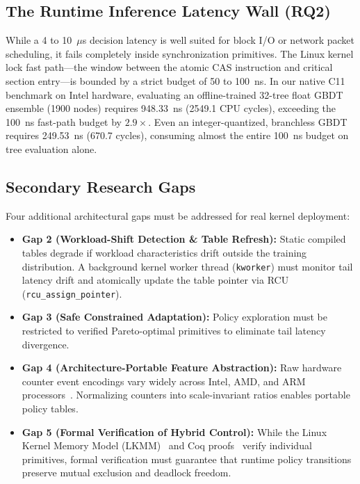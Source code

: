 \documentclass[conference]{IEEEtran}
\begin{document}
\subsection{The Runtime Inference Latency Wall (RQ2)}
While a 4 to 10~$\mu$s decision latency is well suited for block I/O or network packet scheduling, it fails completely inside synchronization primitives. The Linux kernel lock fast path---the window between the atomic CAS instruction and critical section entry---is bounded by a strict budget of 50 to 100~ns. In our native C11 benchmark on Intel hardware, evaluating an offline-trained 32-tree float GBDT ensemble (1900 nodes) requires 948.33~ns (2549.1 CPU cycles), exceeding the 100~ns fast-path budget by $2.9\times$. Even an integer-quantized, branchless GBDT requires 249.53~ns (670.7 cycles), consuming almost the entire 100~ns budget on tree evaluation alone.

\subsection{Secondary Research Gaps}
Four additional architectural gaps must be addressed for real kernel deployment:
\begin{itemize}
    \item \textbf{Gap 2 (Workload-Shift Detection \& Table Refresh):} Static compiled tables degrade if workload characteristics drift outside the training distribution. A background kernel worker thread (\texttt{kworker}) must monitor tail latency drift and atomically update the table pointer via RCU (\texttt{rcu\_assign\_pointer}).
    \item \textbf{Gap 3 (Safe Constrained Adaptation):} Policy exploration must be restricted to verified Pareto-optimal primitives to eliminate tail latency divergence.
    \item \textbf{Gap 4 (Architecture-Portable Feature Abstraction):} Raw hardware counter event encodings vary widely across Intel, AMD, and ARM processors~\cite{intel2024sdm}. Normalizing counters into scale-invariant ratios enables portable policy tables.
    \item \textbf{Gap 5 (Formal Verification of Hybrid Control):} While the Linux Kernel Memory Model (LKMM)~\cite{alglave2018frightening} and Coq proofs~\cite{tassarotti2015verifying} verify individual primitives, formal verification must guarantee that runtime policy transitions preserve mutual exclusion and deadlock freedom.
\end{itemize}
\end{document}
